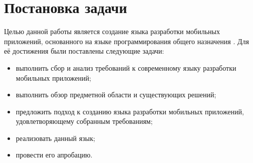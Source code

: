 \section{Постановка задачи}
Целью данной работы является создание языка разработки
мобильных приложений, основанного на языке программирования общего
назначения . Для её достижения были поставлены следующие задачи:
\begin{itemize}
	\item выполнить сбор и анализ требований к современному языку
	разработки мобильных приложений;
	\item выполнить обзор предметной области и существующих решений;
	\item предложить подход к созданию языка разработки мобильных
	приложений, удовлетворяющему собранным требованиям;
	\item реализовать данный язык;
	\item провести его апробацию.
\end{itemize}